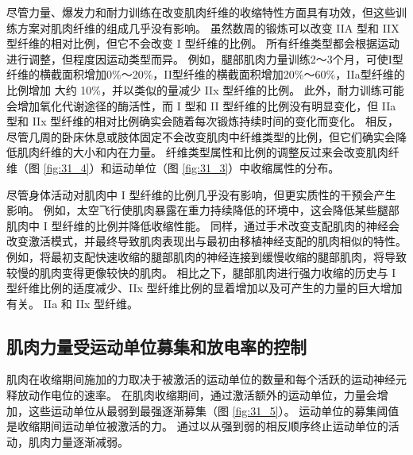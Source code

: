 尽管力量、爆发力和耐力训练在改变肌肉纤维的收缩特性方面具有功效，但这些训练方案对肌肉纤维的组成几乎没有影响。 虽然数周的锻炼可以改变 IIA 型和 IIX 型纤维的相对比例，但它不会改变 I 型纤维的比例。 所有纤维类型都会根据运动进行调整，但程度因运动类型而异。 例如，腿部肌肉力量训练2～3个月，可使I型纤维的横截面积增加0\%～20\%，II型纤维的横截面积增加20\%～60\%，IIa型纤维的比例增加 大约 10\%，并以类似的量减少 IIx 型纤维的比例。 此外，耐力训练可能会增加氧化代谢途径的酶活性，而 I 型和 II 型纤维的比例没有明显变化，但 IIa 型和 IIx 型纤维的相对比例确实会随着每次锻炼持续时间的变化而变化。 相反，尽管几周的卧床休息或肢体固定不会改变肌肉中纤维类型的比例，但它们确实会降低肌肉纤维的大小和内在力量。 纤维类型属性和比例的调整反过来会改变肌肉纤维（图 \ref{fig:31_4}）和运动单位（图 \ref{fig:31_3}）中收缩属性的分布。

尽管身体活动对肌肉中 I 型纤维的比例几乎没有影响，但更实质性的干预会产生影响。 例如，太空飞行使肌肉暴露在重力持续降低的环境中，这会降低某些腿部肌肉中 I 型纤维的比例并降低收缩性能。 同样，通过手术改变支配肌肉的神经会改变激活模式，并最终导致肌肉表现出与最初由移植神经支配的肌肉相似的特性。 例如，将最初支配快速收缩的腿部肌肉的神经连接到缓慢收缩的腿部肌肉，将导致较慢的肌肉变得更像较快的肌肉。 相比之下，腿部肌肉进行强力收缩的历史与 I 型纤维比例的适度减少、IIx 型纤维比例的显着增加以及可产生的力量的巨大增加有关。 IIa 和 IIx 型纤维。


\subsection{肌肉力量受运动单位募集和放电率的控制}
肌肉在收缩期间施加的力取决于被激活的运动单位的数量和每个活跃的运动神经元释放动作电位的速率。 
在肌肉收缩期间，通过激活额外的运动单位，力量会增加，这些运动单位从最弱到最强逐渐募集（图 \ref{fig:31_5}）。
运动单位的募集阈值是收缩期间运动单位被激活的力。 通过以从强到弱的相反顺序终止运动单位的活动，肌肉力量逐渐减弱。

